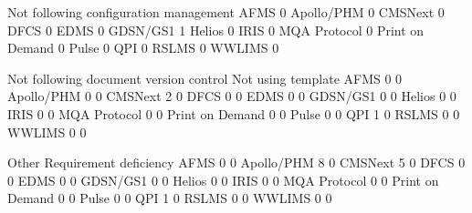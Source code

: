 \documentclass{article}
\begin{document}
\begin{Schunk}
\begin{Soutput}
                  Not following configuration management
  AFMS                                                 0
  Apollo/PHM                                           0
  CMSNext                                              0
  DFCS                                                 0
  EDMS                                                 0
  GDSN/GS1                                             1
  Helios                                               0
  IRIS                                                 0
  MQA Protocol                                         0
  Print on Demand                                      0
  Pulse                                                0
  QPI                                                  0
  RSLMS                                                0
  WWLIMS                                               0
                 
                  Not following document version control Not using template
  AFMS                                                 0                  0
  Apollo/PHM                                           0                  0
  CMSNext                                              2                  0
  DFCS                                                 0                  0
  EDMS                                                 0                  0
  GDSN/GS1                                             0                  0
  Helios                                               0                  0
  IRIS                                                 0                  0
  MQA Protocol                                         0                  0
  Print on Demand                                      0                  0
  Pulse                                                0                  0
  QPI                                                  1                  0
  RSLMS                                                0                  0
  WWLIMS                                               0                  0
                 
                  Other Requirement deficiency
  AFMS                0                      0
  Apollo/PHM          8                      0
  CMSNext             5                      0
  DFCS                0                      0
  EDMS                0                      0
  GDSN/GS1            0                      0
  Helios              0                      0
  IRIS                0                      0
  MQA Protocol        0                      0
  Print on Demand     0                      0
  Pulse               0                      0
  QPI                 1                      0
  RSLMS               0                      0
  WWLIMS              0                      0
\end{Soutput}
\end{Schunk}
\end{document}
